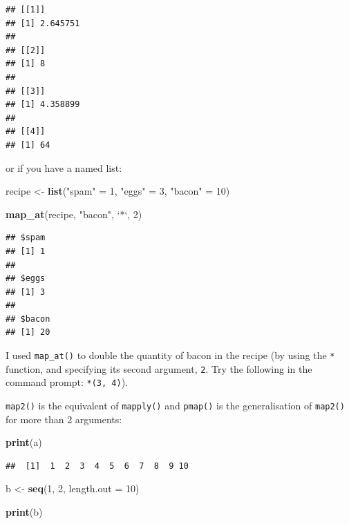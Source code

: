 \documentclass[]{gitbook}
\newenvironment{Shaded}{\begin{snugshade}}{\end{snugshade}}
\newcommand{\DataTypeTok}[1]{\textcolor[rgb]{0.13,0.29,0.53}{#1}}
\newcommand{\DecValTok}[1]{\textcolor[rgb]{0.00,0.00,0.81}{#1}}
\newcommand{\KeywordTok}[1]{\textcolor[rgb]{0.13,0.29,0.53}{\textbf{#1}}}
\newcommand{\NormalTok}[1]{#1}
\newcommand{\StringTok}[1]{\textcolor[rgb]{0.31,0.60,0.02}{#1}}
\theoremstyle{definition}
\theoremstyle{definition}
\theoremstyle{definition}
\theoremstyle{remark}
\begin{document}
\begin{verbatim}
## [[1]]
## [1] 2.645751
## 
## [[2]]
## [1] 8
## 
## [[3]]
## [1] 4.358899
## 
## [[4]]
## [1] 64
\end{verbatim}

or if you have a named list:

\begin{Shaded}
\begin{Highlighting}[]
\NormalTok{recipe <-}\StringTok{ }\KeywordTok{list}\NormalTok{(}\StringTok{"spam"}\NormalTok{ =}\StringTok{ }\DecValTok{1}\NormalTok{, }\StringTok{"eggs"}\NormalTok{ =}\StringTok{ }\DecValTok{3}\NormalTok{, }\StringTok{"bacon"}\NormalTok{ =}\StringTok{ }\DecValTok{10}\NormalTok{)}

\KeywordTok{map_at}\NormalTok{(recipe, }\StringTok{"bacon"}\NormalTok{, }\StringTok{`}\DataTypeTok{*}\StringTok{`}\NormalTok{, }\DecValTok{2}\NormalTok{)}
\end{Highlighting}
\end{Shaded}

\begin{verbatim}
## $spam
## [1] 1
## 
## $eggs
## [1] 3
## 
## $bacon
## [1] 20
\end{verbatim}

I used \texttt{map\_at()} to double the quantity of bacon in the recipe
(by using the \texttt{*} function, and specifying its second argument,
\texttt{2}. Try the following in the command prompt:
\texttt{\textasciigrave{}*\textasciigrave{}(3,\ 4)}).

\texttt{map2()} is the equivalent of \texttt{mapply()} and
\texttt{pmap()} is the generalisation of \texttt{map2()} for more than 2
arguments:

\begin{Shaded}
\begin{Highlighting}[]
\KeywordTok{print}\NormalTok{(a)}
\end{Highlighting}
\end{Shaded}

\begin{verbatim}
##  [1]  1  2  3  4  5  6  7  8  9 10
\end{verbatim}

\begin{Shaded}
\begin{Highlighting}[]
\NormalTok{b <-}\StringTok{ }\KeywordTok{seq}\NormalTok{(}\DecValTok{1}\NormalTok{, }\DecValTok{2}\NormalTok{, }\DataTypeTok{length.out =} \DecValTok{10}\NormalTok{)}

\KeywordTok{print}\NormalTok{(b)}
\end{Highlighting}
\end{Shaded}
\end{document}
